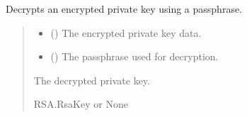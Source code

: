 \documentclass[letterpaper,10pt,english]{sphinxmanual}
\begin{document}
\begin{fulllineitems}
\label{\detokenize{server1:server1.decrypt_private_key}}
\pysigstartsignatures
{}
\pysigstopsignatures
\sphinxAtStartPar
Decrypts an encrypted private key using a passphrase.
\begin{quote}\begin{description}
\begin{itemize}
\item {} 
\sphinxAtStartPar
{} () \textendash{} The encrypted private key data.

\item {} 
\sphinxAtStartPar
{} () \textendash{} The passphrase used for decryption.

\end{itemize}

\sphinxAtStartPar
The decrypted private key.

\sphinxAtStartPar
RSA.RsaKey or None

\end{description}\end{quote}

\end{fulllineitems}

\end{document}
